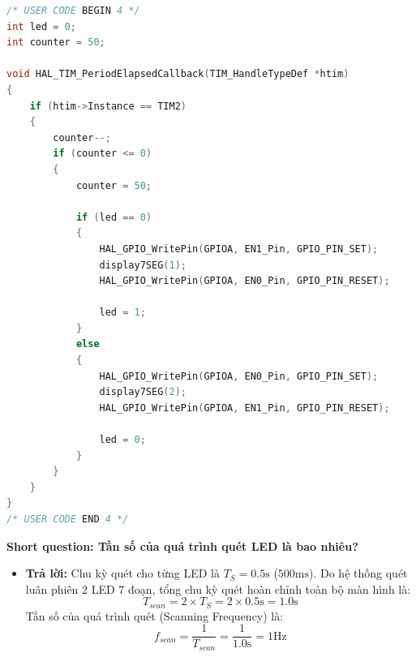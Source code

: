 \begin{lstlisting}[language=C, caption={Hàm ngắt Timer điều khiển quét 2 LED 7 đoạn hiển thị số 1 và 2}, label={lst:lab2_ex1_code}]
/* USER CODE BEGIN 4 */
int led = 0;
int counter = 50;

void HAL_TIM_PeriodElapsedCallback(TIM_HandleTypeDef *htim)
{
    if (htim->Instance == TIM2)
    {
        counter--;
        if (counter <= 0)
        {
            counter = 50;

            if (led == 0)
            {
                HAL_GPIO_WritePin(GPIOA, EN1_Pin, GPIO_PIN_SET);
                display7SEG(1);
                HAL_GPIO_WritePin(GPIOA, EN0_Pin, GPIO_PIN_RESET);

                led = 1;
            }
            else
            {
                HAL_GPIO_WritePin(GPIOA, EN0_Pin, GPIO_PIN_SET);
                display7SEG(2);
                HAL_GPIO_WritePin(GPIOA, EN1_Pin, GPIO_PIN_RESET);

                led = 0;
            }
        }
    }
}
/* USER CODE END 4 */

\end{lstlisting}

\vspace{0.3cm}

\textbf{Short question: Tần số của quá trình quét LED là bao nhiêu?}
\begin{itemize}
    \item \textbf{Trả lời:} 
    Chu kỳ quét cho từng LED là $T_S = 0.5\text{s}$ ($500\text{ms}$). Do hệ thống quét luân phiên $2$ LED 7 đoạn, tổng chu kỳ quét hoàn chỉnh toàn bộ màn hình là:
    $$T_{scan} = 2 \times T_S = 2 \times 0.5\text{s} = 1.0\text{s}$$
    Tần số của quá trình quét (Scanning Frequency) là:
    $$f_{scan} = \frac{1}{T_{scan}} = \frac{1}{1.0\text{s}} = 1\text{Hz}$$
\end{itemize}